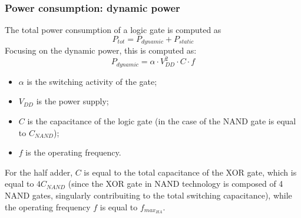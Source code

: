 \subsubsection{Power consumption: dynamic power}\label{ha_dyn_pow}
The total power consumption of a logic gate is computed as
\begin{equation}
P_{tot} = P_{dynamic} + P_{static}
\end{equation}
Focusing on the dynamic power, this is computed as:
\begin{equation}
P_{dynamic} = \alpha\cdot V_{DD}^2\cdot C\cdot f
\end{equation}
\begin{itemize}
	\item $\alpha$ is the switching activity of the gate;
	\item $V_{DD}$ is the power supply;
	\item $C$ is the capacitance of the logic gate (in the case of the NAND gate is equal to $C_{NAND}$);
	\item $f$ is the operating frequency.
\end{itemize}
For the half adder, $C$ is equal to the total capacitance of the XOR gate, which is equal to $4C_{NAND}$ (since the XOR gate in NAND technology is composed of 4 NAND gates, singularly contribuiting to the total switching capacitance), while the operating frequency $f$ is equal to $f_{max_{HA}}$.
